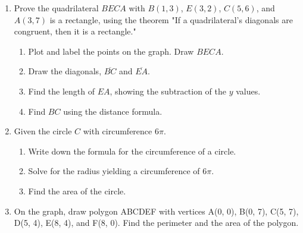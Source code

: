 \documentclass[12pt, oneside]{article}
\begin{document}
\begin{enumerate}
  \item Prove the quadrilateral $BECA$ with $B(1, 3)$, $E(3, 2)$, $C(5,6)$, and $A(3, 7)$ is a rectangle, using the theorem "If a quadrilateral's diagonals are congruent, then it is a rectangle."
  \begin{enumerate}
    \item Plot and label the points on the graph. Draw $BECA$.
    \item Draw the diagonals, $\overline{BC}$ and $\overline{EA}$.
    \item Find the length of $EA$, showing the subtraction of the $y$ values.
    \item Find $BC$ using the distance formula.
  \end{enumerate}

  \item Given the circle $C$ with circumference $6\pi$.
  \begin{enumerate}
    \item Write down the formula for the circumference of a circle. \vspace{1.5cm}
    \item Solve for the radius yielding a circumference of $6\pi$. \vspace{2cm}
    \item Find the area of the circle.
  \end{enumerate}

\newpage
  \item On the graph, draw polygon ABCDEF with vertices A(0, 0), B(0, 7), C(5, 7), D(5, 4), E(8, 4), and F(8, 0). Find the perimeter and the area of the polygon.\\[1cm]
  \vspace{2cm}


\end{enumerate}
\end{document}
